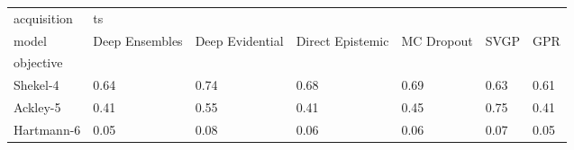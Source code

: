 \begin{tabular}{lllllll}
\toprule
acquisition & \multicolumn{6}{l}{ts} \\
model & Deep Ensembles & Deep Evidential & Direct Epistemic & MC Dropout &  SVGP &   GPR \\
objective  &                &                 &                  &            &       &       \\
\midrule
Shekel-4   &           0.64 &            0.74 &             0.68 &       0.69 &  0.63 &  0.61 \\
Ackley-5   &           0.41 &            0.55 &             0.41 &       0.45 &  0.75 &  0.41 \\
Hartmann-6 &           0.05 &            0.08 &             0.06 &       0.06 &  0.07 &  0.05 \\
\bottomrule
\end{tabular}
